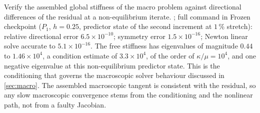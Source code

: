 \taim Verify the assembled global stiffness of the macro problem against
directional differences of the residual at a non-equilibrium iterate.
\trun {}; full command in 
\tobtain Frozen checkpoint ($P_1$, $h=0.25$, predictor state of the
second increment at $1\,\%$ stretch): relative directional error $6.5\times10^{-10}$;
symmetry error $1.5\times10^{-16}$; Newton linear solve accurate to $5.1\times10^{-16}$.
The free stiffness has eigenvalues of magnitude $0.44$ to $1.46\times10^4$, a condition
estimate of $3.3\times10^4$, of the order of $\kappa/\mu=10^4$, and one negative eigenvalue at this
non-equilibrium predictor state. This is the conditioning that governs the
macroscopic solver behaviour discussed in \cref{sec:macro}.
\tinfer The assembled macroscopic tangent is consistent with the residual, so any slow macroscopic convergence stems from the conditioning and the nonlinear path, not from a faulty Jacobian.
